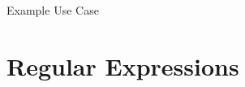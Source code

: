 \documentclass[10pt]{beamer}
\begin{document}
\begin{frame}{Example Use Case}
  \begin{center}
  \end{center}
\end{frame}

\section{Regular Expressions}
\end{document}
